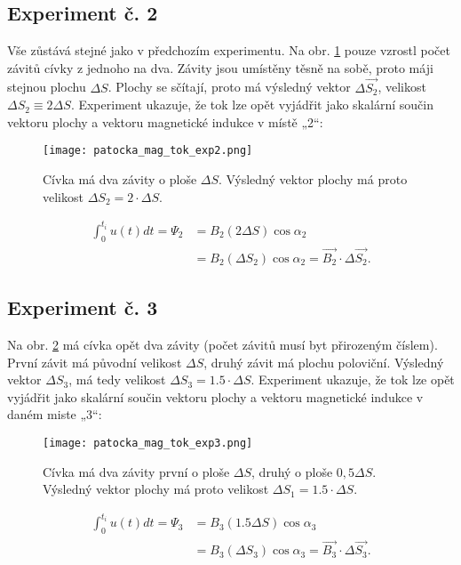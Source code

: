       \subsection{Experiment č. 2}
        Vše zůstává stejné jako v předchozím experimentu. Na obr. \ref{es:fig_patocka_mag_tok_exp2} 
        pouze vzrostl počet závitů cívky z jednoho na dva. Závity jsou umístěny těsně na sobě, 
        proto máji stejnou plochu \(\Delta S\). Plochy se sčítají, proto má výsledný vektor 
        \(\Delta \vec{S_2}\), velikost \(\Delta S_2\equiv2\Delta S\). Experiment ukazuje, že tok 
        lze opět vyjádřit jako skalární součin vektoru plochy a vektoru magnetické indukce v místě 
        „2“:
        \begin{figure}[ht!]
          \centering
          \texttt{[image: patocka\_mag\_tok\_exp2.png]}
          \caption{Cívka má dva závity o ploše \(\Delta S\). Výsledný vektor plochy má proto 
                   velikost \(\Delta S_2 = 2\cdot\Delta S\). \cite[s.~13]{Patocka4}}
          \label{es:fig_patocka_mag_tok_exp2}
        \end{figure}
        \begin{align}
          \int_0^{t_i} u(t)dt = \Psi_2 
             &= B_2(2\Delta S)\cos\alpha_2                           \nonumber \\
             &= B_2(\Delta S_2)\cos\alpha_2 
              = \vec{B_2}\cdot\Delta\vec{S_2}.                       \label{ES:eq_zakl_elm08}
        \end{align}

      \subsection{Experiment č. 3}
        Na obr. \ref{es:fig_patocka_mag_tok_exp3} má cívka opět dva závity (počet závitů musí byt 
        přirozeným číslem). První závit má původní velikost \(\Delta S\), druhý závit má plochu 
        poloviční. Výsledný vektor \(\Delta S_3\), má tedy velikost \(\Delta S_3 = 
        \num{1.5}\cdot\Delta S\). Experiment ukazuje, že tok lze opět vyjádřit jako skalární součin 
        vektoru plochy a vektoru magnetické indukce v daném miste „3“:
        \begin{figure}[ht!]
          \centering
          \texttt{[image: patocka\_mag\_tok\_exp3.png]}
          \caption{Cívka má dva závity první o ploše \(\Delta S\), druhý o ploše \(0,5\Delta S\). 
                   Výsledný vektor plochy má proto velikost \(\Delta S_1 = \num{1.5}\cdot\Delta 
                   S\). \cite[s.~13]{Patocka4}}
          \label{es:fig_patocka_mag_tok_exp3}
        \end{figure}
         \begin{align}
           \int_0^{t_i} u(t)dt = \Psi_3 
             &= B_3(\num{1.5}\Delta S)\cos\alpha_3                  \nonumber  \\
             &= B_3(\Delta S_3)\cos\alpha_3 
              = \vec{B_3}\cdot\Delta\vec{S_3}.                      \label{ES:eq_zakl_elm09}
         \end{align}
         

